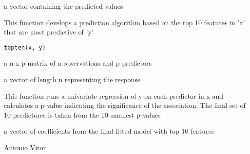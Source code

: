 \documentclass[a4paper]{book}
\begin{document}
%
\begin{Value}
a vector containing the predicted values
\end{Value}
%
\begin{Description}\relax
This function develops a prediction algorithm based on the top 10 features
in 'x' that are most predictive of 'y'
\end{Description}
%
\begin{Usage}
\begin{verbatim}
topten(x, y)
\end{verbatim}
\end{Usage}
%
\begin{Arguments}
\begin{ldescription}
\item[\code{x}] a n x p matrix of n observations and p predictors

\item[\code{y}] a vector of length n representing the response
\end{ldescription}
\end{Arguments}
%
\begin{Details}\relax
This function runs a univariate regression of y on each predictor in x and
calculates a p-value indicating the significance of the association, The final
set of 10 predictores is taken from the 10 smallest p-values
\end{Details}
%
\begin{Value}
a vector of coefficients from the final fitted model with top 10 features
\end{Value}
%
\begin{Author}\relax
Antonio Vitor
\end{Author}
%
\begin{SeeAlso}\relax
{}
\end{SeeAlso}
\printindex{}
\end{document}
